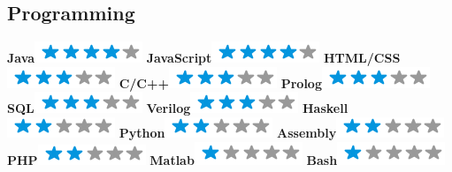 \documentclass[]{friggeri-cv}
\begin{document}
\begin{aside}
  \section{Programming}
   \textbf{Java}\includegraphics[scale=0.40]{img/4stars.png}
   \textbf{JavaScript}\includegraphics[scale=0.40]{img/4stars.png}
   \textbf{HTML/CSS}\includegraphics[scale=0.40]{img/3stars.png}
   \textbf{C/C++}\includegraphics[scale=0.40]{img/3stars.png}
   \textbf{Prolog}\includegraphics[scale=0.40]{img/3stars.png}   \textbf{SQL}\includegraphics[scale=0.40]{img/3stars.png}
   \textbf{Verilog}\includegraphics[scale=0.40]{img/3stars.png}
   \textbf{Haskell}\includegraphics[scale=0.40]{img/2stars.png}
   \textbf{Python}\includegraphics[scale=0.40]{img/2stars.png}
   \textbf{Assembly}\includegraphics[scale=0.40]{img/2stars.png}
   \textbf{PHP}\includegraphics[scale=0.40]{img/2stars.png}
   \textbf{Matlab}\includegraphics[scale=0.40]{img/1stars.png}
   \textbf{Bash}\includegraphics[scale=0.40]{img/1stars.png}
    ~

\end{aside}
\end{document}
